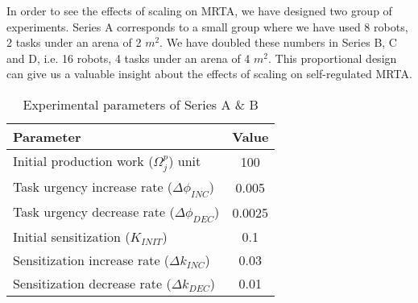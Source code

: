 \documentclass[journal]{IEEEtran}
\begin{document}
In order to see the effects of scaling on MRTA, we have designed two group of experiments. Series A corresponds to a small group where we have used 8 robots, 2 tasks under an arena of 2 $m^2$. We have doubled these numbers in Series B, C and D, i.e. 16 robots, 4 tasks under an arena of 4 $m^2$. This proportional design can give us a valuable insight about the effects of scaling on self-regulated MRTA. 
\begin{table}[t]
\caption{\small Experimental parameters of Series A \& B }
\label{table:params}
\begin{center}
\begin{small}
\begin{tabular}{|p{2in}|c|}
\hline Parameter &  Value\\
\hline Initial production work ($\Omega_{j}^{p}$) unit & 100\\
\hline Task urgency increase rate ($\Delta\phi_{INC}$) & 0.005\\
\hline Task urgency decrease rate ($\Delta\phi_{DEC}$) & 0.0025\\
\hline Initial sensitization ($K_{INIT}$) & 0.1\\
\hline Sensitization increase rate ($\Delta k_{INC}$) & 0.03\\
\hline Sensitization decrease rate ($\Delta k_{DEC}$) & 0.01\\
\hline
\end{tabular}
\end{small}
\end{center}
\vspace*{-1cm}
\end{table}
\end{document}
